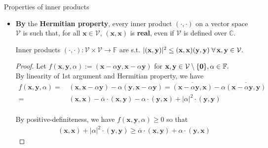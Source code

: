 \documentclass[t,usepdftitle=false]{beamer}
\begin{document}
\begin{frame}{Properties of inner products}
\begin{itemize}
\vspace{-.075cm}
\item \textbf{By} the \textbf{Hermitian property}, every inner product $(\cdot,\cdot)$ on a vector space $\mathcal{V}$ is such that, for all $\mathbf{x}\in\mathcal{V}$, $(\mathbf{x},\mathbf{x})$ is \textbf{real}, even if $\mathcal{V}$ is defined over $\mathbb{C}$.\vspace{-.1cm}
\begin{theorem}
Inner products $(\cdot,\cdot):\mathcal{V}\times\mathcal{V}\rightarrow\mathbb{F}$ are s.t. $|(\mathbf{x},\mathbf{y})|^2\leq(\mathbf{x},\mathbf{x})(\mathbf{y},\mathbf{y})\;\forall\,\mathbf{x},\mathbf{y}\in\mathcal{V}.\hspace{-1cm}$\vspace{-.05cm}
\end{theorem}
\vspace{-.15cm}
\begin{proof}
Let $f(\mathbf{x},\mathbf{y},\alpha):=(\mathbf{x}-\alpha\mathbf{y},\mathbf{x}-\alpha\mathbf{y})$ for $\mathbf{x},\mathbf{y}\in\mathcal{V}\setminus\{\mathbf{0}\},\alpha\in\mathbb{F}.\hspace{-1cm}$\vspace{.075cm}\\
By linearity of 1st argument and Hermitian property, we have\vspace{-.275cm}
\begin{align*}
f(\mathbf{x},\mathbf{y},\alpha)=&\,(\mathbf{x},\mathbf{x}-\alpha\mathbf{y})-\alpha(\mathbf{y},\mathbf{x}-\alpha\mathbf{y})
=\overline{(\mathbf{x}-\alpha\mathbf{y},\mathbf{x})}-\alpha\overline{(\mathbf{x}-\alpha\mathbf{y},\mathbf{y})}\\
=&\,
(\mathbf{x},\mathbf{x})-
\overline{\alpha}\cdot(\mathbf{x},\mathbf{y})
-\alpha\cdot(\mathbf{y},\mathbf{x})
+|\alpha|^2\cdot(\mathbf{y},\mathbf{y})
\end{align*}
\vspace{-.775cm}\\
By positive-definiteness, we have $f(\mathbf{x},\mathbf{y},\alpha)\geq0$ so that\vspace{-.275cm}
\begin{align*}
(\mathbf{x},\mathbf{x})+|\alpha|^2\cdot(\mathbf{y},\mathbf{y})\geq
\overline{\alpha}\cdot(\mathbf{x},\mathbf{y})
+\alpha\cdot(\mathbf{y},\mathbf{x})
\end{align*}

\end{proof}
\end{itemize}
\end{frame}
\end{document}
